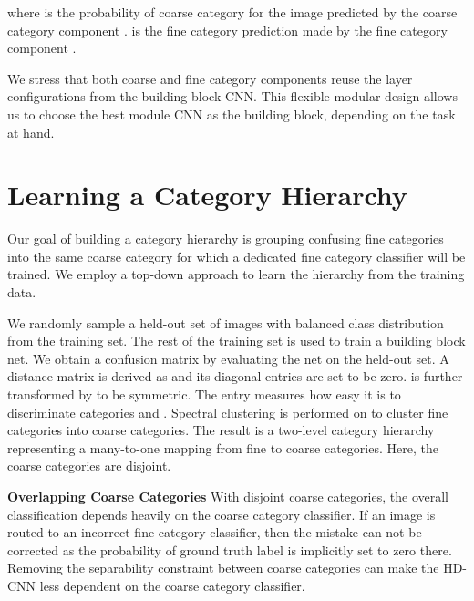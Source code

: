 \documentclass[10pt,twocolumn,letterpaper]{article}
\begin{document}
\vspace{-0.5em}

where  is the probability of coarse category  for the image  predicted by the coarse category component .  is the fine category prediction made by the fine category component .

We stress that both coarse and fine category components reuse the layer configurations from the building block CNN. This flexible modular design allows us to choose the best module CNN as the building block, depending on the task at hand.














\section{Learning a Category Hierarchy}
\label{sec:coarse_category}

Our goal of building a category hierarchy is grouping confusing fine categories into the same coarse category for which a dedicated fine category classifier will be trained. We employ a top-down approach to learn the hierarchy from the training data.

We randomly sample a held-out set of images with balanced class distribution from the training set. The rest of the training set is used to train a building block net.
We obtain a confusion matrix  by evaluating the net on the held-out set. A distance matrix  is derived as  and its diagonal entries are set to be zero.  is further transformed by  to be symmetric. The entry  measures how easy it is to discriminate categories  and .
Spectral clustering is performed on  to cluster fine categories into   coarse categories. 
The result is a two-level category hierarchy representing a many-to-one mapping  from fine to coarse categories. Here, the coarse categories are disjoint.













\noindent \textbf{Overlapping Coarse Categories}
With disjoint coarse categories, the overall classification depends heavily on the coarse category classifier. If an image is routed to an incorrect fine category classifier, then the mistake can not be corrected as the probability of ground truth label is implicitly set to zero there. Removing the separability constraint between coarse categories can make the HD-CNN less dependent on the coarse category classifier. 
\end{document}
